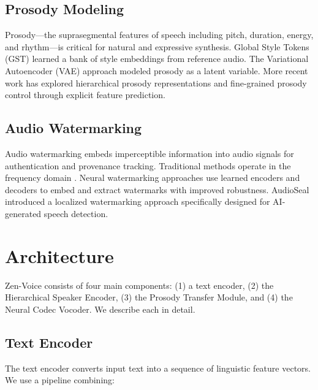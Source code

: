 \documentclass[11pt,a4paper]{article}
\begin{document}
\subsection{Prosody Modeling}

Prosody---the suprasegmental features of speech including pitch, duration, energy, and rhythm---is critical for natural and expressive synthesis. Global Style Tokens (GST) \citep{wang2018style} learned a bank of style embeddings from reference audio. The Variational Autoencoder (VAE) approach \citep{zhang2019learning} modeled prosody as a latent variable. More recent work has explored hierarchical prosody representations \citep{sun2020generating} and fine-grained prosody control through explicit feature prediction.

\subsection{Audio Watermarking}

Audio watermarking embeds imperceptible information into audio signals for authentication and provenance tracking. Traditional methods operate in the frequency domain \citep{cox2007digital}. Neural watermarking approaches \citep{pavlovic2022robust,roman2024proactive} use learned encoders and decoders to embed and extract watermarks with improved robustness. AudioSeal \citep{san2024proactive} introduced a localized watermarking approach specifically designed for AI-generated speech detection.

\section{Architecture}
\label{sec:architecture}

Zen-Voice consists of four main components: (1) a text encoder, (2) the Hierarchical Speaker Encoder, (3) the Prosody Transfer Module, and (4) the Neural Codec Vocoder. We describe each in detail.

\subsection{Text Encoder}
\label{sec:text_encoder}

The text encoder converts input text into a sequence of linguistic feature vectors. We use a pipeline combining:
\end{document}
